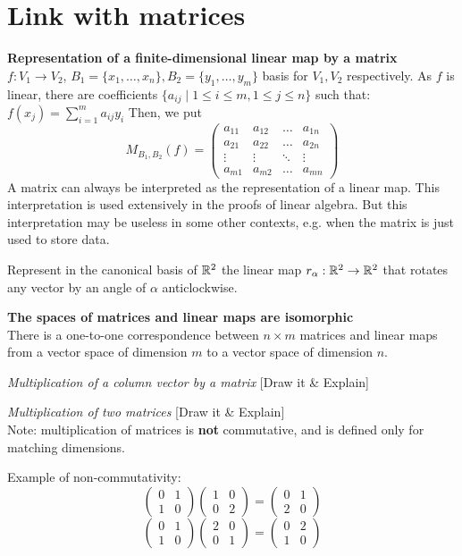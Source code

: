 \section{Link with matrices}
\textbf{Representation of a finite-dimensional linear map by a matrix}\\
$f:V_1 \to V_2$, $B_1=\{x_1,\dots,x_n\},B_2=\{y_1,\dots,y_m\}$ basis for $V_1,V_2$ respectively.
As $f$ is linear, there are coefficients $\{a_{ij} \mid 1 \leq i \leq m, 1 \leq j \leq n\}$ such that: $f(x_j)=\sum_{i=1}^{m}a_{ij}y_i$
Then, we put 
$$
M_{B_1,B_2}(f)=
\begin{pmatrix}
	a_{11} & a_{12} & \dots  & a_{1n} \\
	a_{21} & a_{22} & \dots  & a_{2n} \\
	\vdots & \vdots & \ddots & \vdots \\
	a_{m1} & a_{m2} & \dots  & a_{mn}
\end{pmatrix}
$$
A matrix can always be interpreted as the representation of a linear map. This interpretation is used extensively in the proofs of linear algebra. But this interpretation may be useless in some other contexts, e.g. when the matrix is just used to store data.
\begin{exercise}
	Represent in the canonical basis of $\mathbb{R}^2$ the linear map $r_\alpha: \mathbb{R}^2 \to \mathbb{R}^2$ that rotates any vector by an angle of $\alpha$ anticlockwise.
\end{exercise}

\textbf{The spaces of matrices and linear maps are isomorphic}\\
There is a one-to-one correspondence between $n \times m$ matrices and linear maps from a vector space of dimension $m$ to a vector space of dimension $n$.

\textit{Multiplication of a column vector by a matrix}
[Draw it \& Explain]

\textit{Multiplication of two matrices}
[Draw it \& Explain]\\
Note: multiplication of matrices is \textbf{not} commutative, and is defined only for matching dimensions.

Example of non-commutativity:
$$
\begin{pmatrix}
	0&1\\
	1&0
\end{pmatrix}
\begin{pmatrix}
	1&0\\
	0&2
\end{pmatrix}
=
\begin{pmatrix}
	0&1\\
	2&0
\end{pmatrix}
$$
$$
\begin{pmatrix}
	0&1\\
	1&0
\end{pmatrix}
\begin{pmatrix}
	2&0\\
	0&1
\end{pmatrix}
=
\begin{pmatrix}
	0&2\\
	1&0
\end{pmatrix}
$$

